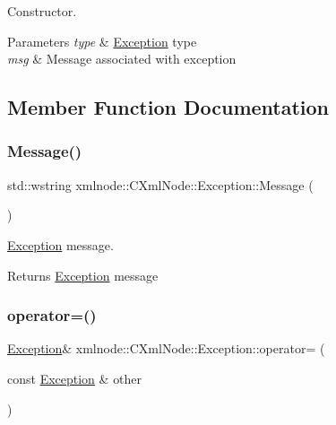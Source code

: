 Constructor. 


\begin{DoxyParams}{Parameters}
{\em type} & \mbox{\hyperlink{classxmlnode_1_1_c_xml_node_1_1_exception}{Exception}} type \\
\hline
{\em msg} & Message associated with exception \\
\hline
\end{DoxyParams}


\subsection{Member Function Documentation}
\mbox{\label{classxmlnode_1_1_c_xml_node_1_1_exception_a29271ad0ec50958663200f60aaae97b2}} 
\subsubsection{\texorpdfstring{Message()}{Message()}}
{\footnotesize\ttfamily std\+::wstring xmlnode\+::\+C\+Xml\+Node\+::\+Exception\+::\+Message (\begin{DoxyParamCaption}{ }\end{DoxyParamCaption})\hspace{0.3cm}{\ttfamily [inline]}}



\mbox{\hyperlink{classxmlnode_1_1_c_xml_node_1_1_exception}{Exception}} message. 

\begin{DoxyReturn}{Returns}
\mbox{\hyperlink{classxmlnode_1_1_c_xml_node_1_1_exception}{Exception}} message 
\end{DoxyReturn}
\mbox{\label{classxmlnode_1_1_c_xml_node_1_1_exception_a40c0f5e49e54cd97c4643c71fbc34014}} 
\subsubsection{\texorpdfstring{operator=()}{operator=()}}
{\footnotesize\ttfamily \mbox{\hyperlink{classxmlnode_1_1_c_xml_node_1_1_exception}{Exception}}\& xmlnode\+::\+C\+Xml\+Node\+::\+Exception\+::operator= (\begin{DoxyParamCaption}\item[{const \mbox{\hyperlink{classxmlnode_1_1_c_xml_node_1_1_exception}{Exception}} \&}]{other }\end{DoxyParamCaption})\hspace{0.3cm}{\ttfamily [inline]}}



